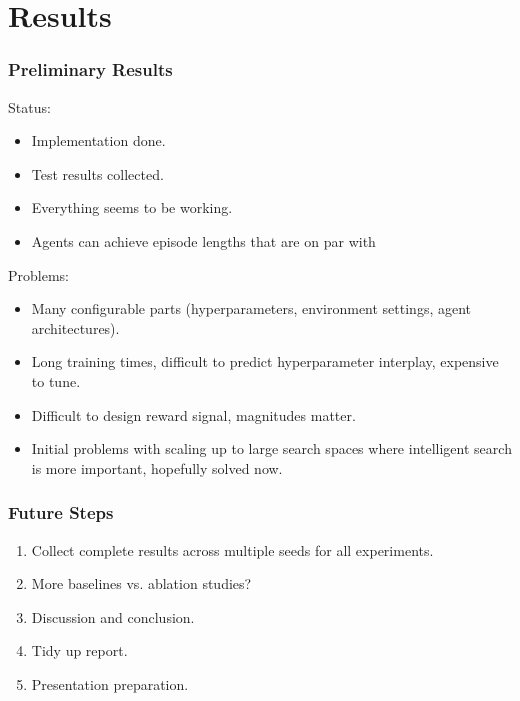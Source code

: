 \section{Results}

\begin{frame}
    \frametitle{Preliminary Results}

    Status:

    \begin{itemize}
        \item Implementation done.
        \item Test results collected.
        \item Everything seems to be working.
        \item Agents can achieve episode lengths that are on par with
    \end{itemize}

    Problems:

    \begin{itemize}
        \item Many configurable parts (hyperparameters, environment settings, agent architectures).
        \item Long training times, difficult to predict hyperparameter interplay, expensive to tune.
        \item Difficult to design reward signal, magnitudes matter.
        \item Initial problems with scaling up to large search spaces where intelligent search is more important, hopefully solved now.
    \end{itemize}
\end{frame}

\begin{frame}
    \frametitle{Future Steps}

    \begin{enumerate}
        \item Collect complete results across multiple seeds for all experiments.
        \item More baselines vs. ablation studies?
        \item Discussion and conclusion.
        \item Tidy up report.
        \item Presentation preparation.
    \end{enumerate}
\end{frame}
